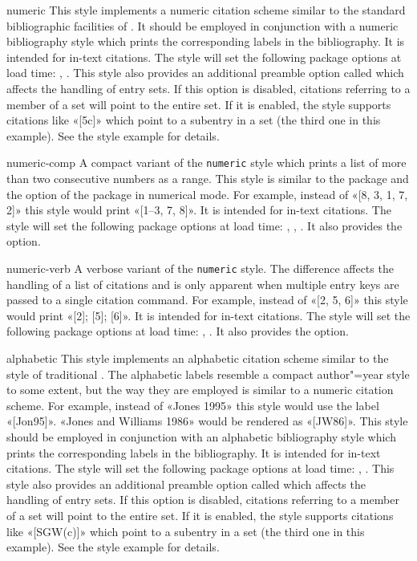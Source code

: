 \documentclass{ltxdockit}[2011/03/25]
\begin{document}
\begin{marglist}

\item[numeric]
This style implements a numeric citation scheme similar to the standard bibliographic facilities of \latex. It should be employed in conjunction with a numeric bibliography style which prints the corresponding labels in the bibliography. It is intended for in-text citations. The style will set the following package options at load time: , . This style also provides an additional preamble option called  which affects the handling of entry sets. If this option is disabled, citations referring to a member of a set will point to the entire set. If it is enabled, the style supports citations like «[5c]» which point to a subentry in a set (the third one in this example). See the style example for details.

\item[numeric-comp]
A compact variant of the \texttt{numeric} style which prints a list of more than two consecutive numbers as a range. This style is similar to the  package and the  option of the  package in numerical mode. For example, instead of «[8, 3, 1, 7, 2]» this style would print «[1--3, 7, 8]». It is intended for in-text citations. The style will set the following package options at load time: , , . It also provides the  option.

\item[numeric-verb]
A verbose variant of the \texttt{numeric} style. The difference affects the handling of a list of citations and is only apparent when multiple entry keys are passed to a single citation command. For example, instead of «[2, 5, 6]» this style would print «[2]; [5]; [6]». It is intended for in-text citations. The style will set the following package options at load time: , . It also provides the  option.

\item[alphabetic]
This style implements an alphabetic citation scheme similar to the  style of traditional \bibtex. The alphabetic labels resemble a compact author"=year style to some extent, but the way they are employed is similar to a numeric citation scheme. For example, instead of «Jones 1995» this style would use the label «[Jon95]». «Jones and Williams 1986» would be rendered as «[JW86]». This style should be employed in conjunction with an alphabetic bibliography style which prints the corresponding labels in the bibliography. It is intended for in-text citations. The style will set the following package options at load time: , . This style also provides an additional preamble option called  which affects the handling of entry sets. If this option is disabled, citations referring to a member of a set will point to the entire set. If it is enabled, the style supports citations like «[SGW(c)]» which point to a subentry in a set (the third one in this example). See the style example for details.


\end{marglist}
\end{document}

